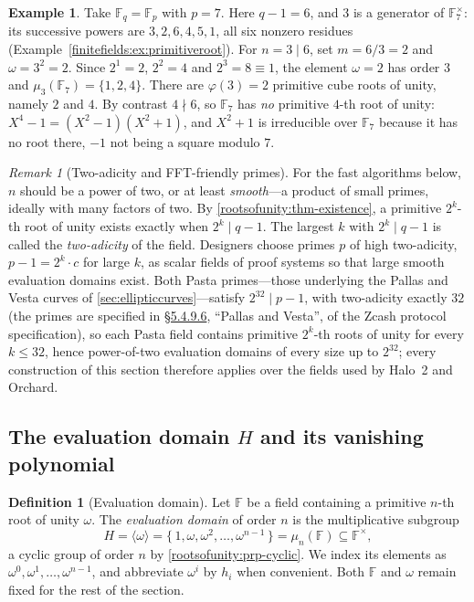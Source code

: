\documentclass[11pt,a4paper]{article}
\theoremstyle{definition}
\newtheorem{definition}[theorem]{Definition}
\newtheorem{example}[theorem]{Example}
\theoremstyle{remark}
\newtheorem{remark}[theorem]{Remark}
\newcommand{\F}{\ensuremath{\mathbb{F}}}
\newcommand{\Fp}{\ensuremath{\mathbb{F}_{p}}}
\newcommand{\Fq}{\ensuremath{\mathbb{F}_{q}}}
\begin{document}
\begin{example}\label{rootsofunity:exp-f7}
Take \(\Fq = \Fp\) with \(p = 7\). Here \(q - 1 = 6\), and \(3\) is a
generator of \(\F_7^\times\): its successive powers are
\(3, 2, 6, 4, 5, 1\), all six nonzero residues
(Example~\ref{finitefields:ex:primitiveroot}). For \(n = 3 \mid 6\), set
\(m = 6/3 = 2\) and \(\omega = 3^2 = 2\). Since \(2^1 = 2\),
\(2^2 = 4\) and \(2^3 = 8 \equiv 1\), the element \(\omega = 2\) has
order \(3\) and \(\mu_3(\F_7) = \{1, 2, 4\}\). There are
\(\varphi(3) = 2\) primitive cube roots of unity, namely \(2\) and
\(4\). By contrast
\(4 \nmid 6\), so \(\F_7\) has \emph{no} primitive \(4\)-th root of
unity: \(X^4 - 1 = (X^2 - 1)(X^2 + 1)\), and \(X^2 + 1\) is irreducible
over \(\F_7\) because it has no root there, \(-1\) not being a square
modulo \(7\).
\end{example}

\begin{remark}[Two-adicity and FFT-friendly primes]
\label{rootsofunity:rem-twoadic}
For the fast algorithms below, \(n\) should be a power of two, or at
least \emph{smooth}---a product of small primes, ideally with many
factors of two. By \cref{rootsofunity:thm-existence}, a primitive
\(2^k\)-th root of unity exists exactly when \(2^k \mid q - 1\). The
largest \(k\) with \(2^k \mid q - 1\) is called the
\emph{two-adicity} of the field. Designers choose primes \(p\) of high
two-adicity, \(p - 1 = 2^k \cdot c\) for large \(k\), as scalar fields
of proof systems so that large smooth evaluation domains exist. Both
Pasta primes---those underlying the Pallas and Vesta curves of
\cref{sec:ellipticcurves}---satisfy \(2^{32} \mid p - 1\), with
two-adicity exactly \(32\) (the primes are specified in
\href{https://zips.z.cash/protocol/protocol.pdf\#pallasandvesta}{\S5.4.9.6},
``Pallas and Vesta'', of the Zcash protocol specification), so each
Pasta field contains primitive \(2^k\)-th roots of unity for every
\(k \le 32\), hence power-of-two evaluation domains of every size up to
\(2^{32}\); every construction of this section therefore applies over
the fields used by Halo~2 and Orchard.
\end{remark}

\subsection{The evaluation domain \texorpdfstring{\(H\)}{H} and its
vanishing polynomial}\label{rootsofunity:sub-domain}

\begin{definition}[Evaluation domain]\label{rootsofunity:def-domain}
Let \(\F\) be a field containing a primitive \(n\)-th root of unity
\(\omega\). The \emph{evaluation domain} of order \(n\) is the
multiplicative subgroup
\[
H = \langle \omega \rangle
= \{\, 1, \omega, \omega^2, \dots, \omega^{n-1} \,\}
= \mu_n(\F) \subseteq \F^\times,
\]
a cyclic group of order \(n\) by \cref{rootsofunity:prp-cyclic}. We
index its elements as \(\omega^0, \omega^1, \dots, \omega^{n-1}\), and
abbreviate \(\omega^i\) by \(h_i\) when convenient. Both \(\F\) and
\(\omega\) remain fixed for the rest of the section.
\end{definition}
\end{document}
